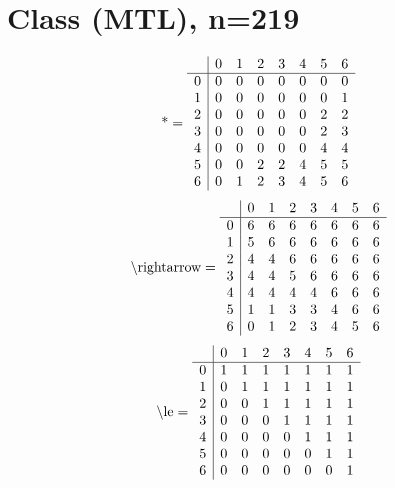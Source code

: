 \documentclass[11pt]{article}
\begin{document}
\section{Class (MTL), n=219}
\[\text{*} = 
\begin{array}{r | r r r r r r r}
 & 0 & 1 & 2 & 3 & 4 & 5 & 6 \\ \hline
0 & 0 & 0 & 0 & 0 & 0 & 0 & 0 \\
1 & 0 & 0 & 0 & 0 & 0 & 0 & 1 \\
2 & 0 & 0 & 0 & 0 & 0 & 2 & 2 \\
3 & 0 & 0 & 0 & 0 & 0 & 2 & 3 \\
4 & 0 & 0 & 0 & 0 & 0 & 4 & 4 \\
5 & 0 & 0 & 2 & 2 & 4 & 5 & 5 \\
6 & 0 & 1 & 2 & 3 & 4 & 5 & 6 \\
\end{array}
\]
\[\text{\textbackslash rightarrow} = 
\begin{array}{r | r r r r r r r}
 & 0 & 1 & 2 & 3 & 4 & 5 & 6 \\ \hline
0 & 6 & 6 & 6 & 6 & 6 & 6 & 6 \\
1 & 5 & 6 & 6 & 6 & 6 & 6 & 6 \\
2 & 4 & 4 & 6 & 6 & 6 & 6 & 6 \\
3 & 4 & 4 & 5 & 6 & 6 & 6 & 6 \\
4 & 4 & 4 & 4 & 4 & 6 & 6 & 6 \\
5 & 1 & 1 & 3 & 3 & 4 & 6 & 6 \\
6 & 0 & 1 & 2 & 3 & 4 & 5 & 6 \\
\end{array}
\]
\[\text{\textbackslash le} = 
\begin{array}{r | r r r r r r r}
 & 0 & 1 & 2 & 3 & 4 & 5 & 6 \\ \hline
0 & 1 & 1 & 1 & 1 & 1 & 1 & 1 \\
1 & 0 & 1 & 1 & 1 & 1 & 1 & 1 \\
2 & 0 & 0 & 1 & 1 & 1 & 1 & 1 \\
3 & 0 & 0 & 0 & 1 & 1 & 1 & 1 \\
4 & 0 & 0 & 0 & 0 & 1 & 1 & 1 \\
5 & 0 & 0 & 0 & 0 & 0 & 1 & 1 \\
6 & 0 & 0 & 0 & 0 & 0 & 0 & 1 \\
\end{array}
\]
\end{document}
